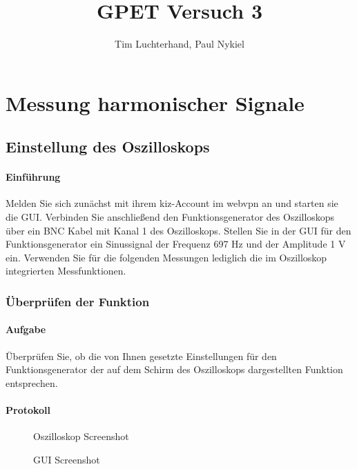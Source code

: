 \documentclass[10pt]{report}
\author{Tim Luchterhand, Paul Nykiel}
\title{GPET Versuch 3}
\begin{document}
        \maketitle

        \section{Messung harmonischer Signale}
        \subsection{Einstellung des Oszilloskops}
        \paragraph{Einführung}
        Melden Sie sich zunächst mit ihrem kiz-Account im webvpn an und starten sie die GUI.\@
        Verbinden Sie anschließend den Funktionsgenerator des Oszilloskops über ein BNC Kabel
        mit Kanal 1 des Oszilloskops. Stellen Sie in der GUI für den Funktionsgenerator ein Sinussignal der Frequenz 697 Hz und der Amplitude 1 V ein. Verwenden Sie für die folgenden
        Messungen lediglich die im Oszilloskop integrierten Messfunktionen.

        \subsubsection{Überprüfen der Funktion}
        \paragraph{Aufgabe}
        Überprüfen Sie, ob die von Ihnen gesetzte Einstellungen für den Funktionsgenerator
        der auf dem Schirm des Oszilloskops dargestellten Funktion entsprechen.

        \paragraph{Protokoll}
        \begin{center}
            \begin{figure}[H]
              \caption{Oszilloskop Screenshot}
            \end{figure}
            \begin{figure}[H]
              \caption{GUI Screenshot}
            \end{figure}
        \end{center}
\end{document}
